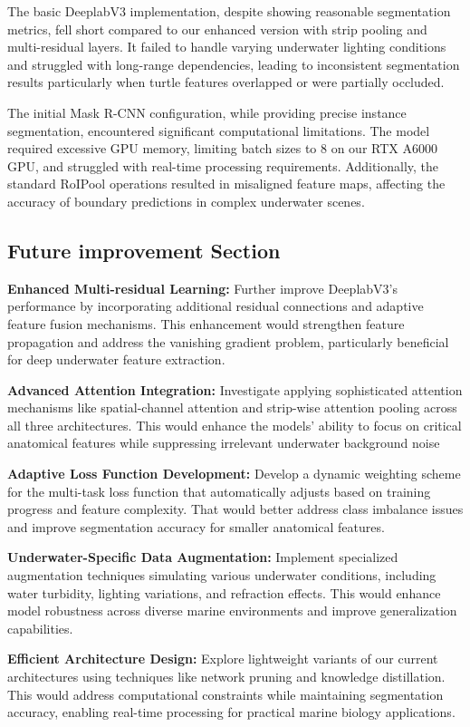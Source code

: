 \documentclass[conference]{IEEEtran}
\begin{document}
The basic DeeplabV3 implementation, despite showing reasonable segmentation metrics, fell short compared to our enhanced version with strip pooling and multi-residual layers. It failed to handle varying underwater lighting conditions and struggled with long-range dependencies, leading to inconsistent segmentation results particularly when turtle features overlapped or were partially occluded.

The initial Mask R-CNN configuration, while providing precise instance segmentation, encountered significant computational limitations. The model required excessive GPU memory, limiting batch sizes to 8 on our RTX A6000 GPU, and struggled with real-time processing requirements. Additionally, the standard RoIPool operations resulted in misaligned feature maps, affecting the accuracy of boundary predictions in complex underwater scenes.
\subsection{Future improvement Section}

\textbf{Enhanced Multi-residual Learning:} Further improve DeeplabV3's performance by incorporating additional residual connections and adaptive feature fusion mechanisms. This enhancement would strengthen feature propagation and address the vanishing gradient problem, particularly beneficial for deep underwater feature extraction.

\textbf{Advanced Attention Integration:} Investigate applying sophisticated attention mechanisms like spatial-channel attention and strip-wise attention pooling across all three architectures. This would enhance the models' ability to focus on critical anatomical features while suppressing irrelevant underwater background noise

\textbf{Adaptive Loss Function Development:} Develop a dynamic weighting scheme for the multi-task loss function that automatically adjusts based on training progress and feature complexity. That would better address class imbalance issues and improve segmentation accuracy for smaller anatomical features.

\textbf{Underwater-Specific Data Augmentation:} Implement specialized augmentation techniques simulating various underwater conditions, including water turbidity, lighting variations, and refraction effects. This would enhance model robustness across diverse marine environments and improve generalization capabilities.

\textbf{Efficient Architecture Design:} Explore lightweight variants of our current architectures using techniques like network pruning and knowledge distillation. This would address computational constraints while maintaining segmentation accuracy, enabling real-time processing for practical marine biology applications.
\end{document}
